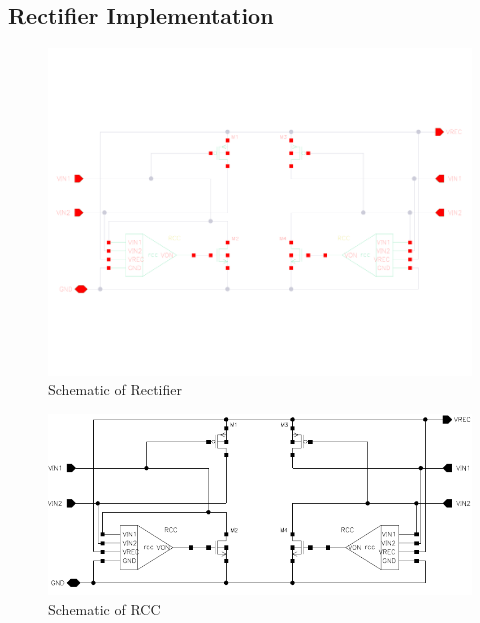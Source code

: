 
\begin{appendices} 	%
\makeatletter
{}
\makeatother

\chapter{Rectifier Implementation}

\begin{figure} [!htbp]	%
 	\centering
  	\includegraphics[width=\textwidth]{appendix/schematic_rectifier_l.pdf} 
 	\caption{Schematic of Rectifier} 
	\label{fig:appen_schematic_rectifer} 
\end{figure}

\begin{figure} [!htbp]	%
 	\centering
  	\includegraphics[width=\textwidth]{appendix/schematic_rectifier_bw.pdf} 
 	\caption{Schematic of RCC} 
	\label{fig:appen_schematic_rcc} 
\end{figure}


\end{appendices}
